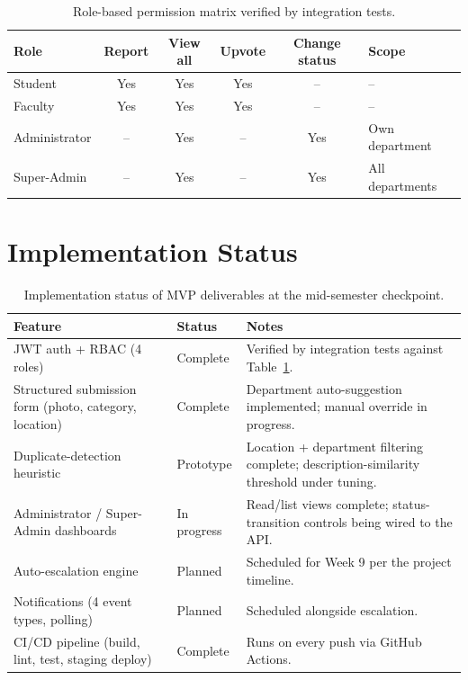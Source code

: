 \documentclass[11pt]{report}
\begin{document}
\begin{table}[H]
\centering
\begin{tabular}{@{}lccccl@{}}
  \toprule
  \textbf{Role} & \textbf{Report} & \textbf{View all}
    & \textbf{Upvote} & \textbf{Change status} & \textbf{Scope} \\
  \midrule
  Student        & Yes & Yes & Yes & --  & -- \\
  Faculty        & Yes & Yes & Yes & --  & -- \\
  Administrator  & --  & Yes & --  & Yes & Own department \\
  Super-Admin    & --  & Yes & --  & Yes & All departments \\
  \bottomrule
\end{tabular}
\caption{Role-based permission matrix verified by integration tests.}
\label{tab:roles}
\end{table}

\section{Implementation Status}

\begin{table}[H]
\centering
\begin{tabular}{|p{6.4cm}|p{2.6cm}|p{5cm}|}
\hline
\textbf{Feature} & \textbf{Status} & \textbf{Notes} \\
\hline
JWT auth + RBAC (4 roles) & Complete & Verified by integration tests against Table~\ref{tab:roles}. \\
\hline
Structured submission form (photo, category, location) & Complete & Department auto-suggestion implemented; manual override in progress. \\
\hline
Duplicate-detection heuristic & Prototype & Location + department filtering complete; description-similarity threshold under tuning. \\
\hline
Administrator / Super-Admin dashboards & In progress & Read/list views complete; status-transition controls being wired to the API. \\
\hline
Auto-escalation engine & Planned & Scheduled for Week 9 per the project timeline. \\
\hline
Notifications (4 event types, polling) & Planned & Scheduled alongside escalation. \\
\hline
CI/CD pipeline (build, lint, test, staging deploy) & Complete & Runs on every push via GitHub Actions. \\
\hline
\end{tabular}
\caption{Implementation status of MVP deliverables at the mid-semester checkpoint.}
\label{tab:status}
\end{table}
\end{document}
